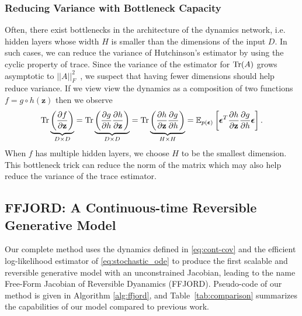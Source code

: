 \documentclass{article} %
\newcommand{\z}{\mathbf{z}}
\newcommand{\veps}{\bm{\epsilon}}
\newcommand{\methodname}{FFJORD\xspace}
\newcommand\0{\kern-1.2pt\vec{\kern1.2pt 0}}
\begin{document}
\subsubsection{Reducing Variance with Bottleneck Capacity}

Often, there exist bottlenecks in the architecture of the dynamics network, i.e. hidden layers whose width $H$ is smaller than the dimensions of the input $D$.
In such cases, we can reduce the variance of Hutchinson's estimator by using the cyclic property of trace.
Since the variance of the estimator for $\operatorname{Tr}(A)$ grows asymptotic to $||A||_F^2$~\citep{hutchinson1989trace}, we suspect that having fewer dimensions should help reduce variance.
If we view view the dynamics as a composition of two functions $f = g \circ h(\z)$ then we observe
\begin{equation}\label{eq:bottleneck_trick}
    \Tr\underbrace{\left( \frac{\partial f}{\partial \z} \right)}_{D \times D} = \Tr\underbrace{\left( \frac{\partial g}{\partial h}\frac{\partial h}{\partial \z} \right)}_{D \times D} = \Tr\underbrace{ \left( \frac{\partial h}{\partial \z}\frac{\partial g}{\partial h} \right)}_{H \times H} = \E_{p(\veps)}\left[ \veps^T \frac{\partial h}{\partial \z}\frac{\partial g}{\partial h} \veps\right].
\end{equation}
When $f$ has multiple hidden layers, we choose $H$ to be the smallest dimension.
This bottleneck trick can reduce the norm of the matrix which may also help reduce the variance of the trace estimator.


\subsection{\methodname: A Continuous-time Reversible Generative Model}
Our complete method uses the dynamics defined in \eqref{eq:cont-cov} and the efficient log-likelihood estimator of \eqref{eq:stochastic_ode} to produce the first scalable and reversible generative model with an unconstrained Jacobian, leading to the name Free-Form Jacobian of Reversible Dyanamics (\methodname).
Pseudo-code of our method is given in Algorithm \ref{alg:ffjord}, and Table~\ref{tab:comparison} summarizes the capabilities of our model compared to previous work.
\end{document}
